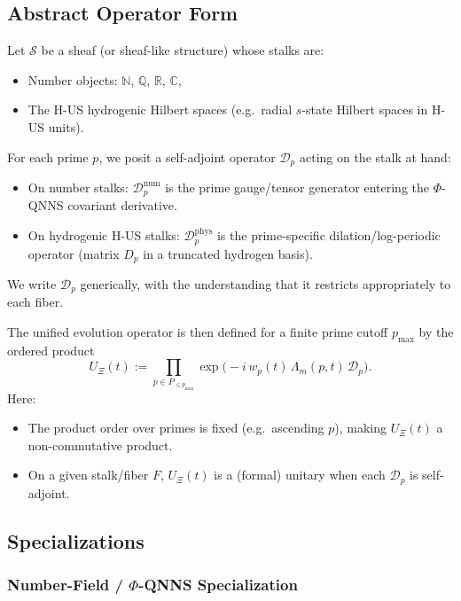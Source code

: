 \documentclass[11pt]{article}
\begin{document}
\subsection{Abstract Operator Form}

Let $\mathcal{S}$ be a sheaf (or sheaf-like structure) whose stalks
are:
\begin{itemize}
  \item Number objects: $\mathbb{N}$, $\mathbb{Q}$, $\mathbb{R}$,
  $\mathbb{C}$,
  \item The H-US hydrogenic Hilbert spaces (e.g.\ radial $s$-state
  Hilbert spaces in H-US units).
\end{itemize}
For each prime $p$, we posit a self-adjoint operator $\mathcal{D}_p$
acting on the stalk at hand:
\begin{itemize}
  \item On number stalks: $\mathcal{D}_p^{\text{num}}$ is the prime
  gauge/tensor generator entering the $\Phi$-QNNS covariant derivative.

  \item On hydrogenic H-US stalks: $\mathcal{D}_p^{\text{phys}}$ is
  the prime-specific dilation/log-periodic operator (matrix $D_p$ in a
  truncated hydrogen basis).
\end{itemize}
We write $\mathcal{D}_p$ generically, with the understanding that it
restricts appropriately to each fiber.

The unified evolution operator is then defined for a finite prime
cutoff $p_{\max}$ by the ordered product
\begin{equation}
  U_{\Xi}(t)
    := \prod_{p\in P_{\le p_{\max}}}
        \exp\bigl(-i\,w_p(t)\,\Lambda_m(p,t)\,\mathcal{D}_p\bigr).
  \label{eq:U_Xi_def}
\end{equation}
Here:
\begin{itemize}
  \item The product order over primes is fixed (e.g.\ ascending $p$),
  making $U_\Xi(t)$ a non-commutative product.
  \item On a given stalk/fiber $F$, $U_\Xi(t)$ is a (formal) unitary
  when each $\mathcal{D}_p$ is self-adjoint.
\end{itemize}

\subsection{Specializations}

\subsubsection{Number-Field / $\Phi$-QNNS Specialization}
\end{document}

